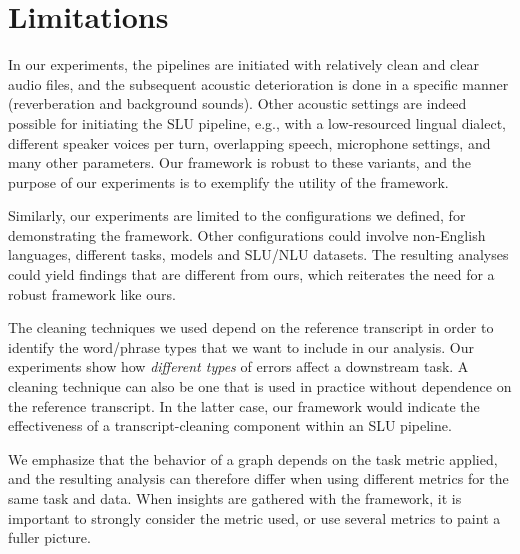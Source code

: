 \section*{Limitations}

In our experiments, the pipelines are initiated with relatively clean and clear audio files, and the subsequent acoustic deterioration is done in a specific manner (reverberation and background sounds). Other acoustic settings are indeed possible for initiating the SLU pipeline, e.g., with a low-resourced lingual dialect, different speaker voices per turn, overlapping speech, microphone settings, and many other parameters. Our framework is robust to these variants, and the purpose of our experiments is to exemplify the utility of the framework.

Similarly, our experiments are limited to the configurations we defined, for demonstrating the framework. Other configurations could involve non-English languages, different tasks, models and SLU/NLU datasets. The resulting analyses could yield findings that are different from ours, which reiterates the need for a robust framework like ours.

The cleaning techniques we used depend on the reference transcript in order to identify the word/phrase types that we want to include in our analysis. Our experiments show how \textit{different types} of errors affect a downstream task. A cleaning technique can also be one that is used in practice without dependence on the reference transcript. In the latter case, our framework would indicate the effectiveness of a transcript-cleaning component within an SLU pipeline.




We emphasize that the behavior of a graph depends on the task metric applied, and the resulting analysis can therefore differ when using different metrics for the same task and data. When insights are gathered with the framework, it is important to strongly consider the metric used, or use several metrics to paint a fuller picture.